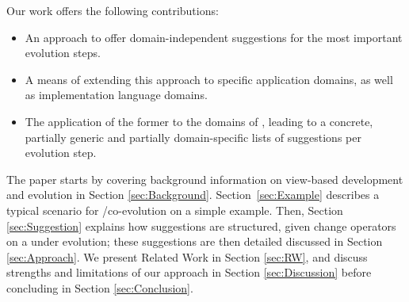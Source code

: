 Our work offers the following contributions:
\begin{itemize}
    \item An approach to offer domain-independent suggestions for the most important \metamodel evolution steps.
    \item A means of extending this approach to specific application domains, 
		as well as implementation language domains. 
    \item The application of the former to the domains of , leading to a concrete, partially generic and partially domain-specific lists of suggestions per \metamodel evolution step.
\end{itemize}

The paper starts by covering background information on view-based development and
\metamodel evolution in Section \ref{sec:Background}. Section~\ref{sec:Example} describes
a typical scenario for \metamodel/\viewtype co-evolution on a simple example. Then,
Section \ref{sec:Suggestion} explains how \viewtype suggestions are structured, given
change operators on a \metamodel under evolution; these suggestions are then 
detailed discussed in Section \ref{sec:Approach}. We present Related Work in 
Section \ref{sec:RW}, and discuss strengths and limitations of our approach in 
Section \ref{sec:Discussion} before concluding in Section \ref{sec:Conclusion}.